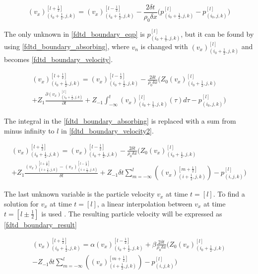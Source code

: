 \begin{equation}\label{fdtd_boundary_eqp}
(v_x)_{(i_0+\frac{1}{2},j,k)}^{[l+\frac{1}{2}]}= (v_x)_{(i_0+\frac{1}{2},j,k)}^{[l-\frac{1}{2}]}-\frac{2 \delta t}{\rho_0 \delta x} \Biggl( 
p_{(i_0+\frac{1}{2},j,k)}^{[l]} -p_{(i_0,j,k)}^{[l]}  \Biggr)
\end{equation}

The only unknown in \autoref{fdtd_boundary_eqp} is $p_{(i_0+\frac{1}{2},j,k)}^{[l]}$, but it can be found by using \autoref{fdtd_boundary_absorbing}, where $v_n$ is changed with $(v_x)_{(i_0+\frac{1}{2},j,k)}^{[l]}$ and becomes \autoref{fdtd_boundary_velocity}.


\begin{multline}\label{fdtd_boundary_velocity}
(v_x)_{(i_0+\frac{1}{2},j,k)}^{[l+\frac{1}{2}]}= (v_x)_{(i_0+\frac{1}{2},j,k)}^{[l-\frac{1}{2}]}-\frac{2 \delta t}{\rho_0 \delta x} \Biggl( 
 Z_0(v_x)_{(i_0+\frac{1}{2},j,k)}^{[l]} \\
 +Z_1 \frac{\partial (v_x)_{(i_0+\frac{1}{2},j,k)}^{[l]}}{\partial t} +Z_{-1} \int_{-\infty}^{t} (v_x)_{(i_0+\frac{1}{2},j,k)}^{[l]}(\tau)d\tau -p_{(i_0,j,k)}^{[l]}
\Biggr)
\end{multline}

The integral in the \autoref{fdtd_boundary_absorbing} is replaced with a sum from minus infinity to $l$ in \autoref{fdtd_boundary_velocity2}.

\begin{multline}\label{fdtd_boundary_velocity2}
(v_x)_{(i_0+\frac{1}{2},j,k)}^{[l+\frac{1}{2}]}= (v_x)_{(i_0+\frac{1}{2},j,k)}^{[l-\frac{1}{2}]}-\frac{2 \delta t}{\rho_0 \delta x} \Biggl( 
 Z_0(v_x)_{(i_0+\frac{1}{2},j,k)}^{[l]} \\
+Z_1\frac{(v_x)_{(i+\frac{1}{2},j,k)}^{[l+\frac{1}{2}]}-(v_x)_{(i+\frac{1}{2},j,k)}^{[l-\frac{1}{2}]}}{\delta t}+Z_{-1} \delta t \sum_{m=-\infty}^{l} \left( (v_x)_{(i+\frac{1}{2},j,k)}^{[m+\frac{1}{2}]} \right) -p_{(i,j,k)}^{[l]}
\Biggr)
\end{multline}

The last unknown variable is the particle velocity $v_x$ at time $t=[l]$. To find a solution for $v_x$ at time $t=[l]$, a linear interpolation between $v_x$ at time $t=[l \pm \frac{1}{2}]$ is used \citep{finiteproblems}. The resulting particle velocity will be expressed as \autoref{fdtd_boundary_result}

\begin{multline}\label{fdtd_boundary_result}
(v_x)_{(i_0+\frac{1}{2},j,k)}^{[l+\frac{1}{2}]}= \alpha (v_x)_{(i_0+\frac{1}{2},j,k)}^{[l-\frac{1}{2}]} + \beta \frac{2 \delta t}{\rho_0 \delta x} \Biggl( 
 Z_0(v_x)_{(i_0+\frac{1}{2},j,k)}^{[l]} \\
-Z_{-1} \delta t \sum_{m=-\infty}^{l} \left( (v_x)_{(i+\frac{1}{2},j,k)}^{[m+\frac{1}{2}]} \right) -p_{(i,j,k)}^{[l]}
\Biggr)
\end{multline}



